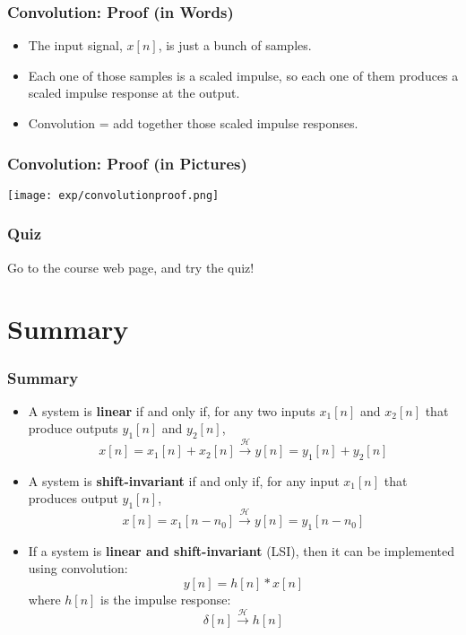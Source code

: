 \documentclass{beamer}
\begin{document}
\begin{frame}
  \frametitle{Convolution: Proof (in Words)}

  \begin{itemize}
  \item The input signal, $x[n]$, is just a bunch of samples.
  \item Each one of those samples is a scaled impulse, so each one of
    them produces a scaled impulse response at the output.
  \item Convolution = add together those scaled impulse responses.
  \end{itemize}
\end{frame}


\begin{frame}
  \frametitle{Convolution: Proof (in Pictures)}

  \centerline{\texttt{[image: exp/convolutionproof.png]}}
\end{frame}

\begin{frame}
  \frametitle{Quiz}

  Go to the course web page, and try the quiz!
\end{frame}

\section[Summary]{Summary}
\setcounter{subsection}{1}

\begin{frame}
  \frametitle{Summary}
  \begin{itemize}
  \item A system is {\bf linear} if and only if, for any two inputs
    $x_1[n]$ and $x_2[n]$ that produce outputs $y_1[n]$ and $y_2[n]$,
    \[
    x[n]=x_1[n]+x_2[n] \stackrel{\mathcal H}{\longrightarrow}  y[n]=y_1[n]+y_2[n]
    \]
  \item A system is {\bf shift-invariant} if and only if, for any input
    $x_1[n]$ that produces output $y_1[n]$,
    \[
    x[n]=x_1[n-n_0] \stackrel{\mathcal H}{\longrightarrow}  y[n]=y_1[n-n_0]
    \]
  \item If a system is {\bf linear and shift-invariant} (LSI), then it
    can be implemented using convolution:
    \[
    y[n] = h[n]\ast x[n]
    \]
    where $h[n]$ is the impulse response:
    \[
    \delta[n] \stackrel{\mathcal H}{\longrightarrow}  h[n]
    \]
  \end{itemize}
\end{frame}
    
\end{document}
